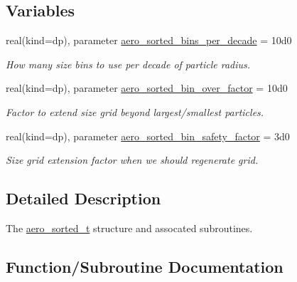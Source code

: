 \subsection*{Variables}
\begin{DoxyCompactItemize}
\item 
real(kind=dp), parameter \mbox{\hyperlink{namespacepmc__aero__sorted_acb40c5cb90b0ff373c45a7558bcca305}{aero\+\_\+sorted\+\_\+bins\+\_\+per\+\_\+decade}} = 10d0
\begin{DoxyCompactList}\small\item\em How many size bins to use per decade of particle radius. \end{DoxyCompactList}\item 
real(kind=dp), parameter \mbox{\hyperlink{namespacepmc__aero__sorted_a8d4f2e6bc86816a9514588cfaf6d26b5}{aero\+\_\+sorted\+\_\+bin\+\_\+over\+\_\+factor}} = 10d0
\begin{DoxyCompactList}\small\item\em Factor to extend size grid beyond largest/smallest particles. \end{DoxyCompactList}\item 
real(kind=dp), parameter \mbox{\hyperlink{namespacepmc__aero__sorted_add014bc362ca68811406a3fd86b27706}{aero\+\_\+sorted\+\_\+bin\+\_\+safety\+\_\+factor}} = 3d0
\begin{DoxyCompactList}\small\item\em Size grid extension factor when we should regenerate grid. \end{DoxyCompactList}\end{DoxyCompactItemize}


\subsection{Detailed Description}
The \mbox{\hyperlink{structpmc__aero__sorted_1_1aero__sorted__t}{aero\+\_\+sorted\+\_\+t}} structure and assocated subroutines. 

\subsection{Function/\+Subroutine Documentation}
\mbox{\label{namespacepmc__aero__sorted_ab76ef898301b54001fdfdfb0ae346bbe}} 
